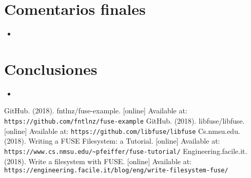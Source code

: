\documentclass{article}
\begin{document}
\section{Comentarios finales}
\begin{itemize}
  \item 
\end{itemize}

\section{Conclusiones}
\begin{itemize}
  \item 
\end{itemize}

\begin{thebibliography}{99}
   GitHub. (2018). fntlnz/fuse-example. [online] Available at: \texttt{https://github.com/fntlnz/fuse-example}
   GitHub. (2018). libfuse/libfuse. [online] Available at: \texttt{https://github.com/libfuse/libfuse}
   Cs.nmsu.edu. (2018). Writing a FUSE Filesystem: a Tutorial. [online] Available at: \texttt{https://www.cs.nmsu.edu/\~{}pfeiffer/fuse-tutorial/}
   Engineering.facile.it. (2018). Write a filesystem with FUSE. [online] Available at: \texttt{https://engineering.facile.it/blog/eng/write-filesystem-fuse/}
\end{thebibliography}
\end{document}
